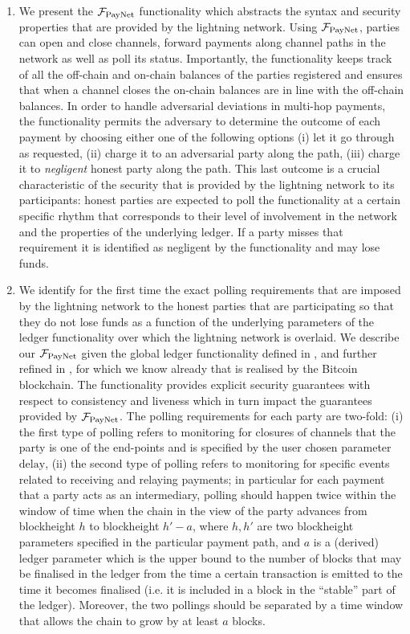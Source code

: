 \begin{enumerate}
\item We present the $\mathcal{F}_{\mathrm{PayNet}}{}$ functionality which abstracts the syntax and
security properties that are provided by the lightning network. Using
$\mathcal{F}_{\mathrm{PayNet}}{}$, parties can open and close channels, forward payments along
channel paths in the network as well as poll its status. Importantly, the
functionality keeps track of all the off-chain and on-chain balances of the
parties registered and ensures that when a channel closes the on-chain balances
are in line with the off-chain balances. In order to handle adversarial
deviations in multi-hop payments, the functionality permits the adversary to
determine the outcome of each payment by choosing either one of the following
options (i) let it go through as requested, (ii) charge it to an adversarial
party along the path, (iii) charge it to {\em negligent } honest party along the
path. This last outcome is a crucial characteristic of the security that is
provided by the lightning network to its participants: honest parties are
expected to poll the functionality at a certain specific rhythm that corresponds
to their level of involvement in the network and the properties of the
underlying ledger. If a party misses that requirement it is identified as
negligent by the functionality and may lose funds.

\item We identify for the first time the exact polling requirements that are
imposed by the lightning network to the honest parties that are participating so
that they do not lose funds as a function of the underlying parameters of the
ledger functionality over which the lightning network is overlaid. We describe
our $\mathcal{F}_{\mathrm{PayNet}}{}$ given the global ledger functionality defined in \cite{BMTZ17},
and further refined in \cite{genesis}, for which we know already that is
realised by the Bitcoin blockchain. The functionality provides explicit security
guarantees with respect to consistency and liveness which in turn impact the
guarantees provided by $\mathcal{F}_{\mathrm{PayNet}}{}$. The polling requirements for each party are
two-fold: (i) the first type of polling refers to monitoring for closures of
channels that the party is one of the end-points and is specified by the user
chosen parameter $\mathrm{delay}$, (ii) the second type of polling refers to
monitoring for specific events related to receiving and relaying payments; in
particular for each payment that a party acts as an intermediary, polling should
happen twice within the window of time when the chain in the view of the party
advances from blockheight $h$ to blockheight $h'-a$, where $h,h'$ are two
blockheight parameters specified in the particular payment path, and $a$ is a
(derived) ledger parameter which is the upper bound to the number of blocks that
may be finalised in the ledger from the time a certain transaction is emitted to
the time it becomes finalised (i.e. it is included in a block in the ``stable''
part of the ledger). Moreover, the two pollings should be separated by a time
window that allows the chain to grow by at least $a$ blocks.


\end{enumerate}
